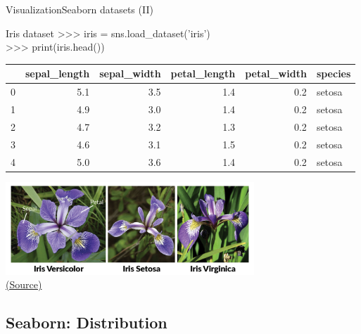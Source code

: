 \documentclass[10pt,compress]{beamer} %
\begin{document}
\begin{frame}[fragile]{Visualization}{Seaborn datasets (II)}
	\footnotesize{
	\begin{exampleblock}{\footnotesize{Iris dataset}}
	>>> iris = sns.load\_dataset('iris')\\
	>>> print(iris.head())\\
	\begin{tabular}{lrrrrl}
	\hline
	{} &  sepal\_length &  sepal\_width &  petal\_length &  petal\_width & species \\
	\hline
	0 &           5.1 &          3.5 &           1.4 &          0.2 &  setosa \\
	1 &           4.9 &          3.0 &           1.4 &          0.2 &  setosa \\
	2 &           4.7 &          3.2 &           1.3 &          0.2 &  setosa \\
	3 &           4.6 &          3.1 &           1.5 &          0.2 &  setosa \\
	4 &           5.0 &          3.6 &           1.4 &          0.2 &  setosa \\
	\hline
	\end{tabular}
	\end{exampleblock}
	}

	\centering \includegraphics[width=0.7\textwidth]{figs/iris-machinelearning.png}\\
	\centering \href{http://www.lac.inpe.br/~rafael.santos/Docs/R/CAP394/WholeStory-Iris.html}{(Source)}
\end{frame}

\subsection{Seaborn: Distribution}
\end{document}
